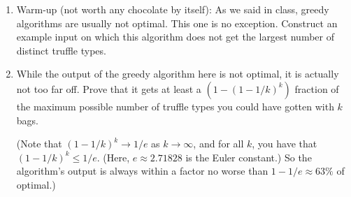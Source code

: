 \documentclass[10pt]{article}
\begin{document}
\begin{enumerate}
\item Warm-up (not worth any chocolate by itself): As we said in class, greedy algorithms are usually not optimal. This one is no exception. Construct an example input on which this algorithm does not get the largest number of distinct truffle types.
\item While the output of the greedy algorithm here is not optimal, it is actually not too far off. Prove that it gets at least a $(1-(1-1/k)^k)$ fraction of the maximum possible number of truffle types you could have gotten with $k$ bags.

  (Note that $(1-1/k)^k \to 1/e$ as $k \to \infty$, and for all $k$, you have that $(1-1/k)^k \leq 1/e$. (Here, $e \approx 2.71828$ is the Euler constant.) So the algorithm's output is always within a factor no worse than $1-1/e \approx 63\%$ of optimal.)
\end{enumerate}
\end{document}
